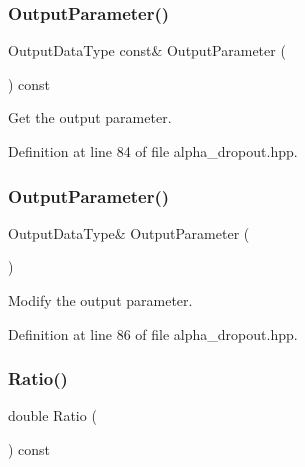 \subsubsection{Output\+Parameter()\hspace{0.1cm}{\footnotesize\ttfamily [1/2]}}
{\footnotesize\ttfamily Output\+Data\+Type const\& Output\+Parameter (\begin{DoxyParamCaption}{ }\end{DoxyParamCaption}) const\hspace{0.3cm}{\ttfamily [inline]}}



Get the output parameter. 



Definition at line 84 of file alpha\+\_\+dropout.\+hpp.

\mbox{\label{classmlpack_1_1ann_1_1AlphaDropout_a21d5f745f02c709625a4ee0907f004a5}} 
\subsubsection{Output\+Parameter()\hspace{0.1cm}{\footnotesize\ttfamily [2/2]}}
{\footnotesize\ttfamily Output\+Data\+Type\& Output\+Parameter (\begin{DoxyParamCaption}{ }\end{DoxyParamCaption})\hspace{0.3cm}{\ttfamily [inline]}}



Modify the output parameter. 



Definition at line 86 of file alpha\+\_\+dropout.\+hpp.

\mbox{\label{classmlpack_1_1ann_1_1AlphaDropout_a0052f2d1427761ea25fb01a05d966a40}} 
\subsubsection{Ratio()\hspace{0.1cm}{\footnotesize\ttfamily [1/2]}}
{\footnotesize\ttfamily double Ratio (\begin{DoxyParamCaption}{ }\end{DoxyParamCaption}) const\hspace{0.3cm}{\ttfamily [inline]}}



